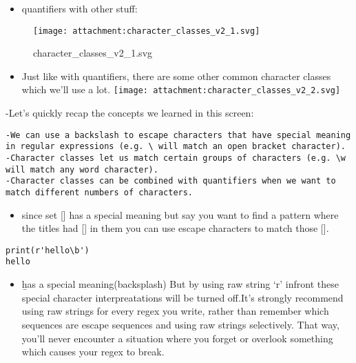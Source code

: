 \documentclass[11pt]{article}
\providecommand{\tightlist}{%
      \setlength{\itemsep}{0pt}\setlength{\parskip}{0pt}}
\begin{document}
\begin{itemize}
\tightlist
\item
  quantifiers with other stuff:
\end{itemize}

\begin{figure}
\centering
\texttt{[image: attachment:character\_classes\_v2\_1.svg]}
\caption{character\_classes\_v2\_1.svg}
\end{figure}

\begin{itemize}
\tightlist
\item
  Just like with quantifiers, there are some other common character
  classes which we'll use a lot.
  \texttt{[image: attachment:character\_classes\_v2\_2.svg]}
\end{itemize}

-Let's quickly recap the concepts we learned in this screen:

\begin{verbatim}
-We can use a backslash to escape characters that have special meaning in regular expressions (e.g. \ will match an open bracket character).
-Character classes let us match certain groups of characters (e.g. \w will match any word character).
-Character classes can be combined with quantifiers when we want to match different numbers of characters.
\end{verbatim}

\begin{itemize}
\tightlist
\item
  since set {[}{]} has a special meaning but say you want to find a
  pattern where the titles had {[}{]} in them you can use escape
  characters to match those {[}{]}.
\end{itemize}

\begin{verbatim}
print(r'hello\b')
hello
\end{verbatim}

\begin{itemize}
\tightlist
\item
  \b has a special meaning(backsplash) But by using raw string `r'
  infront these special character interpreatations will be turned
  off.It's strongly recommend using raw strings for every regex you
  write, rather than remember which sequences are escape sequences and
  using raw strings selectively. That way, you'll never encounter a
  situation where you forget or overlook something which causes your
  regex to break.
\end{itemize}
\end{document}
